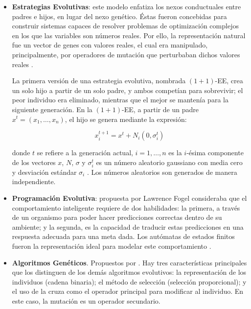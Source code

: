 \begin{itemize}
 \item \textbf{Estrategias Evolutivas}: este modelo enfatiza los nexos conductuales entre padres e hijos, en lugar del nexo gen\'etico. 
 \'Estas fueron concebidas para construir sistemas capaces de resolver problemas de optimizaci\'on complejos en los que las variables
 son n\'umeros reales. Por ello, la representaci\'on natural fue un vector de genes con valores reales, el cual era manipulado, principalmente, 
 por operadores de mutaci\'on que perturbaban dichos valores reales \cite{Back97}.
 
 La primera versi\'on de una estrategia evolutiva, nombrada $(1+1)$-EE, crea un solo hijo a partir de un solo padre, y ambos compet\'ian
 para sobrevivir; el peor individuo era eliminado, mientras que el mejor se manten\'ia para la siguiente generaci\'on. En la $(1+1)$-EE, 
 a partir de un padre $x^{t}=(x_1, \ldots, x_n )$, el hijo se genera mediante la expresi\'on:

 \[x^{t+1}_i=x^{t} + N_i(0, \sigma^{t}_i)\]
 
donde $t$ se refiere a la generaci\'on actual, $i = 1, \ldots, n$ es la $i$-\'esima componente de los vectores $x$, $N$, $\sigma$ y
$\sigma^{t}_i$ es un n\'umero aleatorio gaussiano con media cero y desviaci\'on est\'andar $\sigma_i$ . Los n\'umeros aleatorios 
son generados de manera independiente.
 
 \item \textbf{Programaci\'on Evolutiva}: propuesta por Lawrence Fogel consideraba que el comportamiento inteligente requiere de dos 
 habilidades: la primera, a trav\'es de un organismo para poder hacer predicciones correctas dentro de su ambiente; y la segunda, 
 es la capacidad de traducir estas predicciones en una respuesta adecuada para una 
 meta dada. Los aut\'omatas de estados finitos fueron la representaci\'on ideal para modelar este comportamiento \cite{Fogel64}. 
 
 \item \textbf{Algoritmos Gen\'eticos}. Propuestos por \cite{Holland75}. Hay tres caracter\'isticas principales que los distinguen 
 de los dem\'as algoritmos evolutivos: la representaci\'on de los individuos (cadena binaria); el m\'etodo de selecci\'on (selecci\'on 
 proporcional); y el uso de la cruza como el operador principal para modificar al individuo. En este caso, la mutaci\'on es un operador 
  secundario.

\end{itemize}

